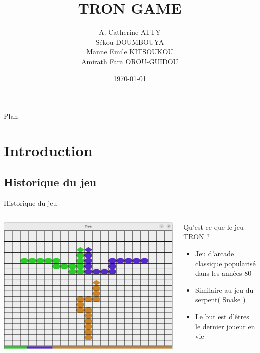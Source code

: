\documentclass{beamer}
\title{TRON GAME}
\author[A. Catherine ATTY \\  Sékou DOUMBOUYA \\ Manne Emile KITSOUKOU \\ Amirath Fara OROU-GUIDOU]{A. Catherine ATTY \\  Sékou DOUMBOUYA \\ Manne Emile KITSOUKOU \\ Amirath Fara OROU-GUIDOU}
\institute[Université de Caen Normandie]{Université de Caen Normandie}
\date{\today}
\begin{document}
    \frame{\titlepage}
    \begin{frame}{Plan}
        \tableofcontents
    \end{frame}


    \section{Introduction}

    \subsection*{Historique du jeu}
    \begin{frame}{Historique du jeu}
        \begin{columns}
            \begin{center}
                \includegraphics[width=\textwidth]{Images/jeu-tron}
            \end{center}
            \begin{block}{Qu'est ce que le jeu TRON ?}
                \pause
                \begin{itemize}
                    [<+->]
                    \item Jeu d'arcade classique popularisé dans les années 80
                    \item Similaire au jeu du serpent( Snake )
                    \item Le but est d'êtres le dernier joueur en vie
                \end{itemize}
            \end{block}

        \end{columns}
    \end{frame}
\end{document}
